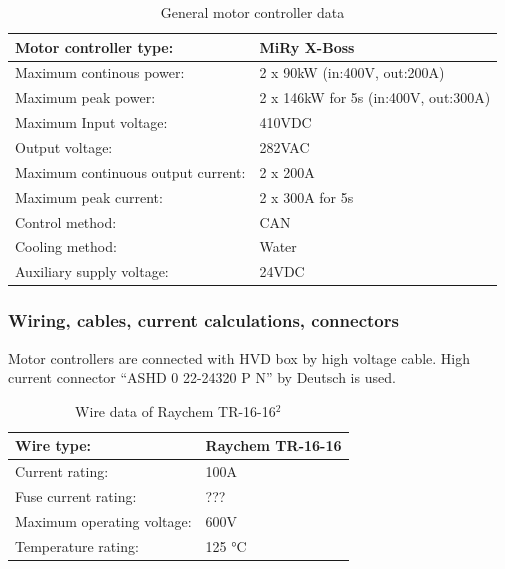 \begin{table}[H]
	\centering
	\caption{General motor controller data}
	\begin{tabularx}{\textwidth}{|X|X|}\hline
		Motor controller type: & MiRy X-Boss \\[\TableSize]\hline
		Maximum continous power: & 2 x 90kW (in:400V, out:200A) \\[\TableSize]\hline
		Maximum peak power: & 2 x 146kW for 5s (in:400V, out:300A) \\[\TableSize]\hline
		Maximum Input voltage: & 410VDC \\[\TableSize]\hline
		Output voltage: & 282VAC \\[\TableSize]\hline
		Maximum continuous output current: & 2 x 200A \\[\TableSize]\hline
		Maximum peak current: & 2 x 300A for 5s \\[\TableSize]\hline
		Control method: & CAN \\[\TableSize]\hline
		Cooling method: & Water \\[\TableSize]\hline
		Auxiliary supply voltage: & 24VDC \\[\TableSize]\hline
	\end{tabularx}%
	\label{tab:MC:general}%
\end{table}%

\subsubsection{Wiring, cables, current calculations, connectors}

Motor controllers are connected with HVD box by high voltage cable. High current connector “ASHD 0 22-24320 P N” by Deutsch is used. 

\begin{table}[H]
	\centering
	\caption{Wire data of Raychem TR-16-16$^2$}
	\begin{tabularx}{\textwidth}{|X|X|}\hline
		Wire type: & Raychem TR-16-16  \\[\TableSize]\hline
		Current rating: & 100A \\[\TableSize]\hline
		Fuse current rating: & ??? \\[\TableSize]\hline
		Maximum operating voltage: & 600V \\[\TableSize]\hline
		Temperature rating: & 125 °C \\[\TableSize]\hline
	\end{tabularx}%
	\label{tab:MC:wire}%
\end{table}%

